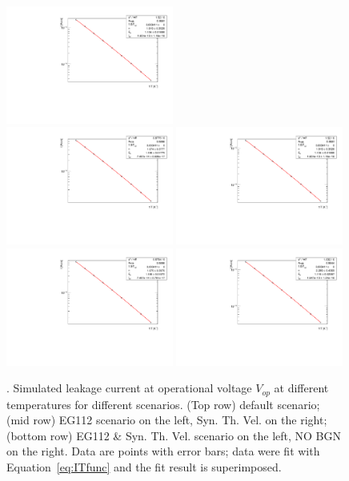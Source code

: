 \begin{figure}[!htbp]
\centering
\includegraphics[width=0.49\textwidth]{default/Ea_Fit.pdf}\\
\includegraphics[width=0.49\textwidth]{EG112/Ea_Fit.pdf}
\includegraphics[width=0.49\textwidth]{Syopsys_thermal_velocities/Ea_Fit.pdf}
\includegraphics[width=0.49\textwidth]{EG112_Syopsys_thermal_velocities/Ea_Fit.pdf}
\includegraphics[width=0.49\textwidth]{nobgn/Ea_Fit.pdf}
\caption{\label{fig:Ea_Fit}. Simulated leakage current at operational voltage $V_{op}$ at different 
temperatures for different scenarios. (Top row) default scenario; (mid row) EG112 scenario on the left,  Syn. Th. Vel. on the right;  (bottom row)  EG112 \&  Syn. Th. Vel. scenario on the left, NO BGN 
on the right. Data are points with error bars; data were fit with Equation~\ref{eq:ITfunc}  and the fit result is superimposed.}
\end{figure}


